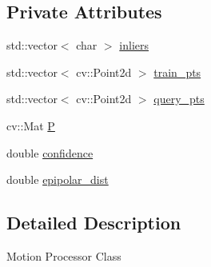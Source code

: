 \subsection*{\-Private \-Attributes}
\begin{DoxyCompactItemize}
\item 
std\-::vector$<$ char $>$ \hyperlink{classLRM_1_1MotionProcessor_a1cebe392055fdfe8002def6c7810f754}{inliers}
\item 
std\-::vector$<$ cv\-::\-Point2d $>$ \hyperlink{classLRM_1_1MotionProcessor_ae72b3aea2c352caefb7f256a40ca6e31}{train\-\_\-pts}
\item 
std\-::vector$<$ cv\-::\-Point2d $>$ \hyperlink{classLRM_1_1MotionProcessor_af0e2f9ee5479177b49a6caf44962faff}{query\-\_\-pts}
\item 
cv\-::\-Mat \hyperlink{classLRM_1_1MotionProcessor_a84d9c7cce3207b43bb79988c32d07f23}{\-P}
\item 
double \hyperlink{classLRM_1_1MotionProcessor_a0220090264566c5e8bc74bfe62f8e332}{confidence}
\item 
double \hyperlink{classLRM_1_1MotionProcessor_ac18eb15f6b48e4e7f00557e2df1cfb3a}{epipolar\-\_\-dist}
\end{DoxyCompactItemize}


\subsection{\-Detailed \-Description}
\-Motion \-Processor \-Class 


